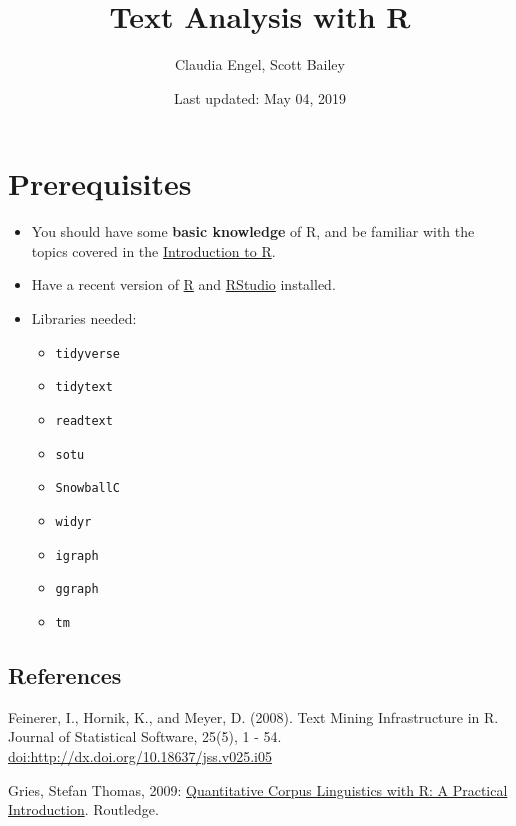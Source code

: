 \documentclass[]{book}
\title{Text Analysis with R}
\author{Claudia Engel, Scott Bailey}
\date{Last updated: May 04, 2019}
\providecommand{\tightlist}{%
  \setlength{\itemsep}{0pt}\setlength{\parskip}{0pt}}
\begin{document}
\maketitle

{
\setcounter{tocdepth}{1}
\tableofcontents
}
\hypertarget{prerequisites}{%
\chapter*{Prerequisites}\label{prerequisites}}

\begin{itemize}
\item
  You should have some \textbf{basic knowledge} of R, and be familiar with the topics covered in the \href{https://cengel.github.io/R-intro/}{Introduction to R}.
\item
  Have a recent version of \href{https://cran.r-project.org/}{R} and \href{https://www.rstudio.com/}{RStudio} installed.
\item
  Libraries needed:

  \begin{itemize}
  \tightlist
  \item
    \texttt{tidyverse}
  \item
    \texttt{tidytext}
  \item
    \texttt{readtext}
  \item
    \texttt{sotu}
  \item
    \texttt{SnowballC}
  \item
    \texttt{widyr}
  \item
    \texttt{igraph}
  \item
    \texttt{ggraph}
  \item
    \texttt{tm}
  \end{itemize}
\end{itemize}

\hypertarget{references}{%
\section*{References}\label{references}}

Feinerer, I., Hornik, K., and Meyer, D. (2008). Text Mining Infrastructure in R. Journal of Statistical Software, 25(5), 1 - 54. \url{doi:http://dx.doi.org/10.18637/jss.v025.i05}

Gries, Stefan Thomas, 2009: \href{http://www.stgries.info/research/qclwr/qclwr.html}{Quantitative Corpus Linguistics with R: A Practical Introduction}. Routledge.
\end{document}
